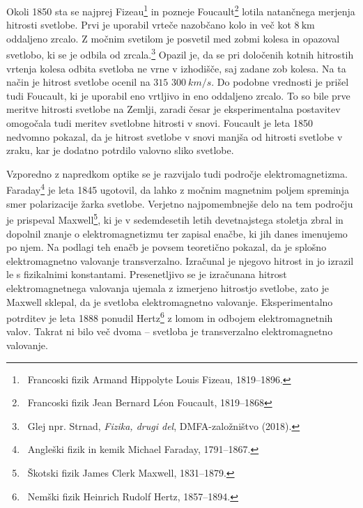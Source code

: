 Okoli 1850 sta se najprej Fizeau\footnote{~Francoski fizik Armand Hippolyte
Louis Fizeau, 1819--1896.} in pozneje Foucault\footnote{~Francoski fizik
Jean Bernard L\'{e}on Foucault, 1819--1868} lotila natančnega
merjenja hitrosti svetlobe. Prvi je uporabil vrteče nazobčano kolo
in več kot $8~\si{\kilo\meter}$ oddaljeno zrcalo. Z močnim svetilom je posvetil med
zobmi kolesa in opazoval svetlobo, ki se je odbila od 
zrcala.\footnote{~Glej npr. Strnad, {\it Fizika, drugi del}, 
DMFA-založništvo (2018).} Opazil je, da se pri določenih kotnih hitrostih 
vrtenja kolesa odbita svetloba ne vrne v izhodišče, saj zadane zob kolesa. 
Na ta način je hitrost svetlobe ocenil na $315\,\,300~\si{km/s}$. Do podobne
vrednosti je prišel tudi Foucault, ki je uporabil eno vrtljivo in eno oddaljeno 
zrcalo. To so bile prve meritve hitrosti svetlobe na Zemlji, zaradi česar
je eksperimentalna postavitev omogočala tudi meritev 
svetlobne hitrosti v snovi. Foucault je leta 1850 nedvomno pokazal, 
da je hitrost svetlobe v snovi manjša od hitrosti svetlobe v zraku, kar je dodatno
potrdilo valovno sliko svetlobe. 

Vzporedno z napredkom optike se je razvijalo tudi področje
elektromagnetizma. Faraday\footnote{~Angleški fizik in kemik Michael Faraday, 1791--1867.}
je leta 1845 ugotovil, da lahko z močnim magnetnim poljem spreminja
smer polarizacije žarka svetlobe. Verjetno najpomembnejše delo
na tem področju je prispeval Maxwell\footnote{~Škotski fizik James Clerk Maxwell,
1831--1879.}, ki je v sedemdesetih letih devetnajstega stoletja
zbral in dopolnil znanje o elektromagnetizmu ter zapisal enačbe, ki jih 
danes imenujemo po njem. Na podlagi teh enačb je povsem 
teoretično pokazal, da je splošno elektromagnetno valovanje 
transverzalno. Izračunal je njegovo hitrost in jo
izrazil le s fizikalnimi konstantami. Presenetljivo se je izračunana 
hitrost elektromagnetnega valovanja ujemala 
z izmerjeno hitrostjo svetlobe, zato je Maxwell sklepal, da je svetloba 
elektromagnetno valovanje. Eksperimentalno potrditev je leta
1888 ponudil Hertz\footnote{~Nemški fizik
Heinrich Rudolf Hertz, 1857--1894.} z lomom in odbojem elektromagnetnih 
valov. Takrat ni bilo več dvoma -- svetloba je transverzalno 
elektromagnetno valovanje. 


